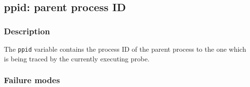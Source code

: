 \clearpage
{}
{}
\label{vars:ppid}
\subsection*{ppid: parent process ID}

\subsubsection*{Description}

The \verb|ppid| variable contains the process ID of the parent process
to the one which is being traced by the currently executing probe.

\subsubsection*{Failure modes}

